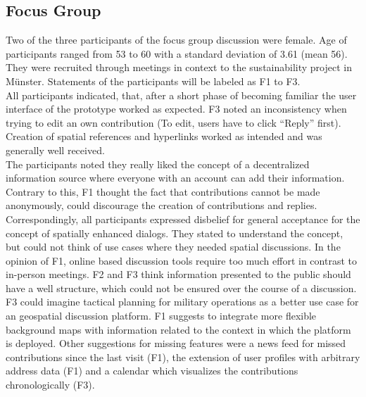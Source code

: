 \subsection{Focus Group}
\label{sub:ev_focus}
Two of the three participants of the focus group discussion were female. Age of participants ranged from 53 to 60 with a standard deviation of 3.61 (mean 56). They were recruited through meetings in context to the sustainability project in Münster. Statements of the participants will be labeled as F1 to F3.\\
All participants indicated, that, after a short phase of becoming familiar the user interface of the prototype worked as expected. F3 noted an inconsistency when trying to edit an own contribution (To edit, users have to click ``Reply'' first). Creation of spatial references and hyperlinks worked as intended and was generally well received. \\
The participants noted they really liked the concept of a decentralized information source where everyone with an account can add their information. Contrary to this, F1 thought the fact that contributions cannot be made anonymously, could discourage the creation of contributions and replies.\\
Correspondingly, all participants expressed disbelief for general acceptance for the concept of spatially enhanced dialogs. They stated to understand the concept, but could not think of use cases where they needed spatial discussions.  In the opinion of F1, online based discussion tools require too much effort in contrast to in-person meetings. F2 and F3 think information presented to the public should have a well structure, which could not be ensured over the course of a discussion. F3 could imagine tactical planning for military operations as a better use case for an geospatial discussion platform. F1 suggests to integrate more flexible background maps with information related to the context in which the platform is deployed. Other suggestions for missing features were a news feed for missed contributions since the last visit (F1), the extension of user profiles with arbitrary address data (F1) and a calendar which visualizes the contributions chronologically (F3).
